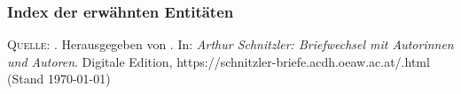 \bigskip

\normalsize

\newenvironment{esempio}[3]%
{
    \vspace{1.5ex}
    \rlap{\underline{#1}}
    \par
    \setlength{\parindent}{0cm}
    \nopagebreak
    \leftskip=#2cm
    \rightskip=#3cm
}
{
    \par
}

\bigskip

\footnotesize

\subsubsection*{Index der erwähnten Entitäten}

\printindex[pw]



\vspace{3cm}

\vfill

\footnotesize
\textsc{Quelle}: \titel. Herausgegeben von {\editorInnen}. In: \emph{Arthur Schnitzler: Briefwechsel mit Autorinnen und Autoren}.
 Digitale Edition, https://schnitzler-briefe.acdh.oeaw.ac.at/{\dateiname}.html (Stand \today)
 


